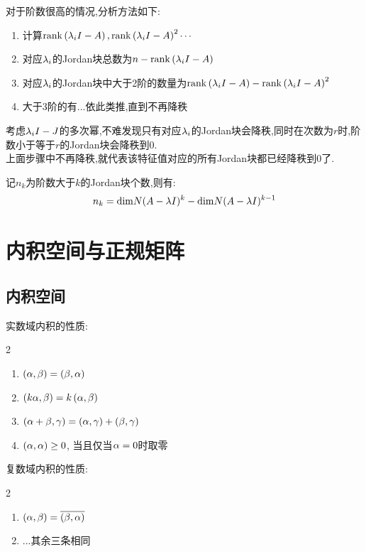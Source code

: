 \documentclass{matrix-review}
\begin{document}
对于阶数很高的情况,分析方法如下:
\begin{enumerate}
    \item 计算$\mathrm{rank}\left(\lambda_iI-A\right),\mathrm{rank}\left(\lambda_iI-A\right)^2\cdots$
    \item 对应$\lambda_i$的Jordan块总数为$n-\mathrm{rank}\left(\lambda_iI-A\right)$
    \item 对应$\lambda_i$的Jordan块中大于2阶的数量为$\mathrm{rank}\left(\lambda_iI-A\right)-\mathrm{rank}\left(\lambda_iI-A\right)^2$
    \item 大于3阶的有...依此类推,直到不再降秩
\end{enumerate}
\begin{remarkbox}
    考虑$\lambda_iI-J$的多次幂,不难发现只有对应$\lambda_i$的Jordan块会降秩,同时在次数为$r$时,阶数小于等于$r$的Jordan块会降秩到0.\\
    上面步骤中不再降秩,就代表该特征值对应的所有Jordan块都已经降秩到0了.
\end{remarkbox}
\begin{remarkbox}[title=另一种等价表述]
    记$n_k$为阶数大于$k$的Jordan块个数,则有:
    $$n_k=\mathrm{dim}N(A-\lambda I)^k-\mathrm{dim}N(A-\lambda I)^{k-1}$$
\end{remarkbox}


\section{内积空间与正规矩阵}
\newcommand{\cross}[2]{\left(#1,#2\right)}
\newcommand{\schmidt}[4]{\frac{\cross{#1}{#2}}{\cross{#3}{#4}}}

\subsection{内积空间}
实数域内积的性质:
\begin{multicols}{2}
    \begin{enumerate}
        \item $\cross{\al}{\be}=\cross{\be}{\al}$
        \item $\cross{k\al}{\be}=k\cross{\al}{\be}$
        \item $\cross{\al+\be}{\gamma}=\cross{\al}{\gamma}+\cross{\be}{\gamma}$
        \item $\cross{\al}{\al}\ge0$, 当且仅当$\alpha=0$时取零
    \end{enumerate}
\end{multicols}

复数域内积的性质:
\begin{multicols}{2}
    \begin{enumerate}
        \item $\cross{\al}{\be}=\overline{\cross{\be}{\al}} $
        \item ...其余三条相同
    \end{enumerate}
\end{multicols}
\end{document}
